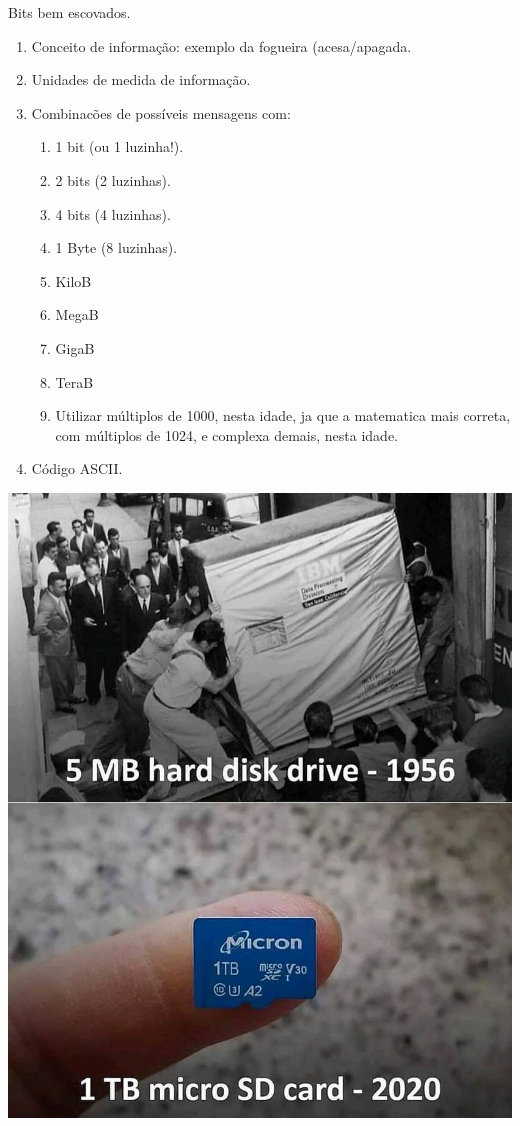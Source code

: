 {\Large Bits bem escovados.}

\begin{enumerate}
	\item Conceito de informação: exemplo da fogueira (acesa/apagada.
	\item Unidades de medida de informação.
	\item Combinacões de possíveis mensagens com:
	\begin{enumerate}
		\item 1 bit (ou 1 luzinha!).
		\item 2 bits (2 luzinhas).
		\item 4 bits (4 luzinhas).
		\item 1 Byte (8 luzinhas).
		\item KiloB
		\item MegaB
		\item GigaB
		\item TeraB
		\item Utilizar múltiplos de 1000, nesta idade, ja que a matematica mais correta, com múltiplos de 1024, e complexa demais, nesta idade.
	\end{enumerate}
	\item Código ASCII.
\end{enumerate}

\begin{center}
	\includegraphics[width=.7\linewidth]{./IMG/hd-1956.jpg}
\end{center}


\vfill\null
\columnbreak
